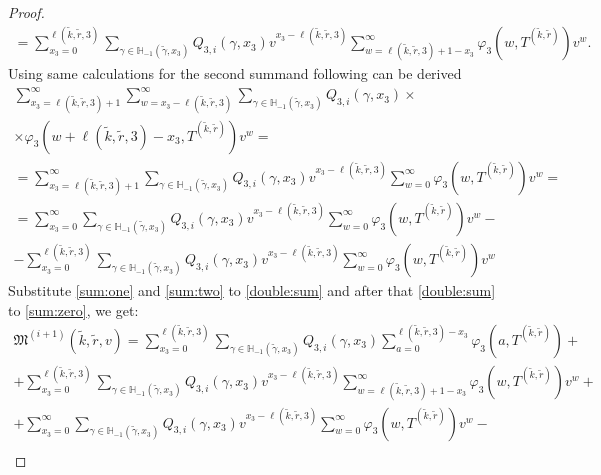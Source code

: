 \documentclass[runningheads,a4paper]{llncs}
\begin{document}
\begin{proof}
\begin{multline}
=\sum_{x_3=0}^{\ell(\tilde{k},\tilde{r},3)}  \sum_{\gamma \in {\mathbb H}_{-1}(\tilde{\gamma},x_3)} Q_{3,i}(\gamma,x_3) v^{x_3-\ell(\tilde{k},\tilde{r},3)}  \sum_{w=\ell(\tilde{k},\tilde{r},3) + 1 -x_3}^{\infty}
\varphi_3(w,T^{(\tilde{k},\tilde{r})}) v^w.
\label{sum:one}
\end{multline}
Using same calculations for the second summand following can be derived
\begin{multline}
\sum_{x_3=\ell(\tilde{k},\tilde{r},3) + 1}^{\infty}\sum_{w=x_3-\ell(\tilde{k},\tilde{r},3)}^{\infty} \sum_{\gamma \in {\mathbb H}_{-1}(\tilde{\gamma},x_3)} Q_{3,i}(\gamma,x_3) \times \\ \times
\varphi_3(w + \ell(\tilde{k},\tilde{r},3) - x_3,T^{(\tilde{k},\tilde{r})}) v^w = \\
=  \sum_{x_3=\ell(\tilde{k},\tilde{r},3) + 1}^{\infty} \sum_{\gamma \in {\mathbb H}_{-1}(\tilde{\gamma},x_3)} Q_{3,i}(\gamma,x_3) v^{x_3-\ell(\tilde{k},\tilde{r},3)}\sum_{w=0}^{\infty}  
\varphi_3(w,T^{(\tilde{k},\tilde{r})}) v^w = \\
= \sum_{x_3=0}^{\infty} \sum_{\gamma \in {\mathbb H}_{-1}(\tilde{\gamma},x_3)} Q_{3,i}(\gamma,x_3) v^{x_3-\ell(\tilde{k},\tilde{r},3)}\sum_{w=0}^{\infty} 
\varphi_3(w,T^{(\tilde{k},\tilde{r})}) v^w - \\
- \sum_{x_3=0}^{\ell(\tilde{k},\tilde{r},3)} \sum_{\gamma \in {\mathbb H}_{-1}(\tilde{\gamma},x_3)} Q_{3,i}(\gamma,x_3) v^{x_3-\ell(\tilde{k},\tilde{r},3)}\sum_{w=0}^{\infty}
\varphi_3(w,T^{(\tilde{k},\tilde{r})}) v^w
\label{sum:two}
\end{multline}
Substitute \eqref{sum:one} and \eqref{sum:two} to \eqref{double:sum} and after that \eqref{double:sum} to \eqref{sum:zero}, we get:
\begin{multline*}
\mathfrak{M}^{(i+1)}(\tilde{k},\tilde{r},v) = \sum_{x_3=0}^{\ell(\tilde{k},\tilde{r},3)}\sum_{\gamma \in {\mathbb H}_{-1}(\tilde{\gamma},x_3)} Q_{3,i}(\gamma,x_3) \sum_{a=0}^{\ell(\tilde{k},\tilde{r},3) - x_3} \varphi_3(a,T^{(\tilde{k},\tilde{r})}) + \\
+ \sum_{x_3=0}^{\ell(\tilde{k},\tilde{r},3)}  \sum_{\gamma \in {\mathbb H}_{-1}(\tilde{\gamma},x_3)} Q_{3,i}(\gamma,x_3) v^{x_3-\ell(\tilde{k},\tilde{r},3)}  \sum_{w=\ell(\tilde{k},\tilde{r},3) + 1 -x_3}^{\infty}
\varphi_3(w,T^{(\tilde{k},\tilde{r})}) v^w + \\
+ \sum_{x_3=0}^{\infty} \sum_{\gamma \in {\mathbb H}_{-1}(\tilde{\gamma},x_3)} Q_{3,i}(\gamma,x_3) v^{x_3-\ell(\tilde{k},\tilde{r},3)}\sum_{w=0}^{\infty} 
\varphi_3(w,T^{(\tilde{k},\tilde{r})}) v^w - \\

\end{multline*}
\end{proof}
\end{document}
